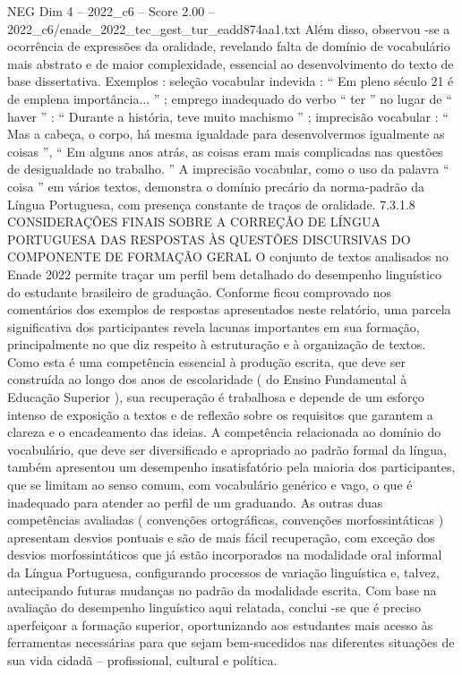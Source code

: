 \begin{textsample}{NEG Dim 4 – 2022\_c6 – Score 2.00 – 2022\_c6/enade\_2022\_tec\_gest\_tur\_eadd874aa1.txt}
Além disso, observou -se a ocorrência de expressões da oralidade, revelando falta de domínio de vocabulário mais abstrato e de maior complexidade, essencial ao desenvolvimento do texto de base dissertativa.
Exemplos : seleção vocabular indevida : “ Em pleno século 21 é de emplena importância... ” ; emprego inadequado do verbo “ ter ” no lugar de “ haver ” : “ Durante a história, teve muito machismo ” ; imprecisão vocabular : “ Mas a cabeça, o corpo, há mesma igualdade para desenvolvermos igualmente as coisas ”, “ Em alguns anos atrás, as coisas eram mais complicadas nas questões de desigualdade no trabalho. ” A imprecisão vocabular, como o uso da palavra “ coisa ” em vários textos, demonstra o domínio precário da norma-padrão da Língua Portuguesa, com presença constante de traços de oralidade. 7.3.1.8 CONSIDERAÇÕES FINAIS SOBRE A CORREÇÃO DE LÍNGUA PORTUGUESA DAS RESPOSTAS ÀS QUESTÕES DISCURSIVAS DO COMPONENTE DE FORMAÇÃO GERAL O conjunto de textos analisados no Enade 2022 permite traçar um perfil bem detalhado do desempenho linguístico do estudante brasileiro de graduação.
Conforme ficou comprovado nos comentários dos exemplos de respostas apresentados neste relatório, uma parcela significativa dos participantes revela lacunas importantes em sua formação, principalmente no que diz respeito à estruturação e à organização de textos.
Como esta é uma competência essencial à produção escrita, que deve ser construída ao longo dos anos de escolaridade ( do Ensino Fundamental à Educação Superior ), sua recuperação é trabalhosa e depende de um esforço intenso de exposição a textos e de reflexão sobre os requisitos que garantem a clareza e o encadeamento das ideias.
A competência relacionada ao domínio do vocabulário, que deve ser diversificado e apropriado ao padrão formal da língua, também apresentou um desempenho insatisfatório pela maioria dos participantes, que se limitam ao senso comum, com vocabulário genérico e vago, o que é inadequado para atender ao perfil de um graduando.
As outras duas competências avaliadas ( convenções ortográficas, convenções morfossintáticas ) apresentam desvios pontuais e são de mais fácil recuperação, com exceção dos desvios morfossintáticos que já estão incorporados na modalidade oral informal da Língua Portuguesa, configurando processos de variação linguística e, talvez, antecipando futuras mudanças no padrão da modalidade escrita.
Com base na avaliação do desempenho linguístico aqui relatada, conclui -se que é preciso aperfeiçoar a formação superior, oportunizando aos estudantes mais acesso às ferramentas necessárias para que sejam bem-sucedidos nas diferentes situações de sua vida cidadã – profissional, cultural e política.

\end{textsample}
